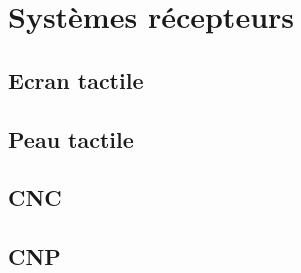 \section{Systèmes récepteurs}
\subsection{Ecran tactile}
\subsection{Peau tactile}
\subsection{CNC}
\subsection{CNP}


